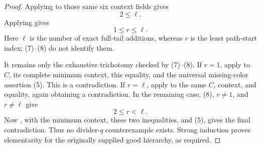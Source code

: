 \begin{proof}
Applying  to those same six
context fields gives
\[
                              2\leq\ell.                      \tag{7}
\]
Applying  gives
\[
                              1\leq r\leq\ell.                \tag{8}
\]
Here \(\ell\) is the number of exact full-tail additions, whereas \(r\) is
the least path-start index; (7)--(8) do not identify them.

It remains only the exhaustive trichotomy checked by (7)--(8).  If \(r=1\),
apply  to \(C\), its complete
minimum context, this equality, and the universal missing-color assertion
(5).  This is a contradiction.  If \(r=\ell\), apply
 to the same \(C\), context, and
equality, again obtaining a contradiction.  In the remaining case,
(8), \(r\ne1\), and \(r\ne\ell\) give
\[
                              2\leq r<\ell.
\]
Now , with the minimum context,
these two inequalities, and (5), gives the final contradiction.  Thus no
divider-\(q\) counterexample exists.  Strong induction proves elementarity
for the originally supplied good hierarchy, as required.
\end{proof}
